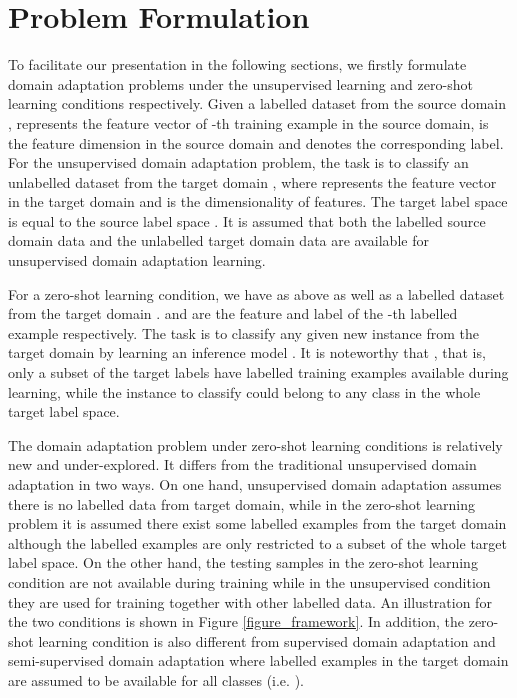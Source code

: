 \documentclass[conference]{IEEEtran}
\begin{document}
\section{Problem Formulation}\label{sec:prob}
To facilitate our presentation in the following sections, we firstly formulate domain adaptation problems under the unsupervised learning and zero-shot learning conditions respectively. Given a labelled dataset  from the source domain ,  represents the feature vector of -th training example in the source domain,  is the feature dimension in the source domain and  denotes the corresponding label. For the unsupervised domain adaptation problem, the task is to classify an unlabelled dataset  from the target domain , where  represents the feature vector in the target domain and  is the dimensionality of features. The target label space  is equal to the source label space . It is assumed that both the labelled source domain data  and the unlabelled target domain data  are available for unsupervised domain adaptation learning.

For a zero-shot learning condition, we have  as above as well as a labelled dataset  from the target domain .  and  are the feature and label of the -th labelled example respectively. The task is to classify any given new instance  from the target domain by learning an inference model . It is noteworthy that , that is, only a subset of the target labels have labelled training examples available during learning, while the instance to classify could belong to any class in the whole target label space.

The domain adaptation problem under zero-shot learning conditions is relatively new and under-explored. It differs from the traditional unsupervised domain adaptation in two ways. On one hand, unsupervised domain adaptation assumes there is no labelled data from target domain, while in the zero-shot learning problem it is assumed there exist some labelled examples from the target domain although the labelled examples are only restricted to a subset of the whole target label space. On the other hand, the testing samples in the zero-shot learning condition are not available during training while in the unsupervised condition they are used for training together with other labelled data. An illustration for the two conditions is shown in Figure \ref{figure_framework}.
In addition, the zero-shot learning condition is also different from supervised domain adaptation \cite{tzeng2015simultaneous,motiian2017unified} and semi-supervised domain adaptation \cite{xiao2015feature,ding2018semi} where labelled examples in the target domain are assumed to be available for all classes (i.e. ).
\end{document}
